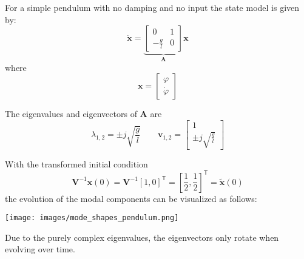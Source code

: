\begin{examplesection}
    For a simple pendulum with no damping and no input the state model is given by:
    \begin{equation*}
        \dot{\mathbf{x}}=\underbrace{\begin{bmatrix}
                0            & 1 \\
                -\frac{g}{l} & 0
            \end{bmatrix}}_{\mathbf{A}}\mathbf{x}
    \end{equation*}
    where
    \begin{equation*}
        \mathbf{x}=\begin{bmatrix}
            \varphi \\
            \dot{\varphi}
        \end{bmatrix}
    \end{equation*}

    The eigenvalues and eigenvectors of $\mathbf{A}$ are
    \begin{equation*}
        \lambda_{1,2} = \pm j \sqrt{\frac{g}{l}} \qquad \mathbf{v}_{1,2}=\begin{bmatrix}
            1 \\
            \pm j \sqrt{\frac{g}{l}}
        \end{bmatrix}
    \end{equation*}

    With the transformed initial condition
    \noindent\begin{equation*}
        \mathbf{V}^{-1}\mathbf{x}(0) = \mathbf{V}^{-1}{[1, 0]}^{\mathsf{T}} = {\left[\frac{1}{2}, \frac{1}{2}\right]}^{\mathsf{T}} = \tilde{\mathbf{x}}(0)
    \end{equation*}
    the evolution of the modal components can be visualized as follows: %

    \texttt{[image: images/mode\_shapes\_pendulum.png]}

    Due to the purely complex eigenvalues, the eigenvectors only rotate when evolving over time.


\end{examplesection}
